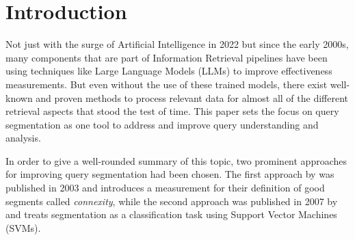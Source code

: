 \section{Introduction} \label{introduction}
Not just with the surge of Artificial Intelligence in 2022 but since the early 2000s, many components that are part of Information Retrieval pipelines have been using techniques like Large Language Models (LLMs) to improve effectiveness measurements. But even without the use of these trained models, there exist well-known and proven methods to process relevant data for almost all of the different retrieval aspects that stood the test of time. This paper sets the focus on query segmentation as one tool to address and improve query understanding and analysis. 

In order to give a well-rounded summary of this topic, two prominent approaches for improving query segmentation had been chosen. The first approach by \citet{Risvik:2003} was published in 2003 and introduces a measurement for their definition of good segments called \textit{connexity}, while the second approach was published in 2007 by \citet{Bergsma:2007} and treats segmentation as a classification task using Support Vector Machines (SVMs).